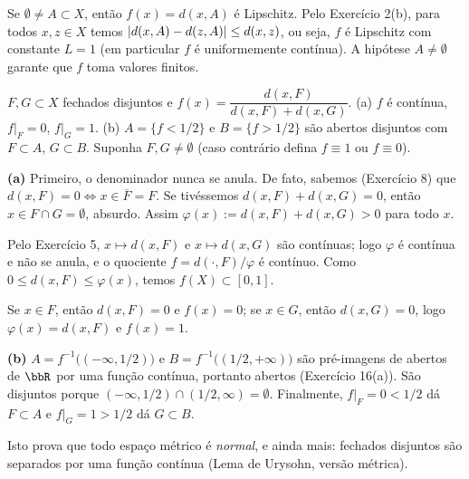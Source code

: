 \begin{exercicio}{Se $\emptyset\neq A\subset X$, então $f(x)=d(x,A)$ é Lipschitz.}
\sol
Pelo Exercício 2(b), para todos $x,z\in X$ temos $\lvert d(x,A)-d(z,A)\rvert\le d(x,z)$, ou seja, $f$ é Lipschitz com constante $L=1$ (em particular $f$ é uniformemente contínua). A hipótese $A\neq\emptyset$ garante que $f$ toma valores finitos.
\end{exercicio}

\begin{exercicio}{$F,G\subset X$ fechados disjuntos e $f(x)=\dfrac{d(x,F)}{d(x,F)+d(x,G)}$. (a) $f$ é contínua, $f|_F=0$, $f|_G=1$. (b) $A=\{f<1/2\}$ e $B=\{f>1/2\}$ são abertos disjuntos com $F\subset A$, $G\subset B$.}
\sol
Suponha $F,G\neq\emptyset$ (caso contrário defina $f\equiv 1$ ou $f\equiv 0$).

\textbf{(a)} Primeiro, o denominador nunca se anula. De fato, sabemos (Exercício 8) que $d(x,F)=0 \iff x\in\overline{F}=F$. Se tivéssemos $d(x,F)+d(x,G)=0$, então $x\in F\cap G=\emptyset$, absurdo. Assim $\varphi(x):=d(x,F)+d(x,G)>0$ para todo $x$.

Pelo Exercício 5, $x\mapsto d(x,F)$ e $x\mapsto d(x,G)$ são contínuas; logo $\varphi$ é contínua e não se anula, e o quociente $f=d(\cdot,F)/\varphi$ é contínuo. Como $0\le d(x,F)\le \varphi(x)$, temos $f(X)\subset[0,1]$.

Se $x\in F$, então $d(x,F)=0$ e $f(x)=0$; se $x\in G$, então $d(x,G)=0$, logo $\varphi(x)=d(x,F)$ e $f(x)=1$.

\textbf{(b)} $A=f^{-1}\bigl((-\infty,1/2)\bigr)$ e $B=f^{-1}\bigl((1/2,+\infty)\bigr)$ são pré-imagens de abertos de $\R$ por uma função contínua, portanto abertos (Exercício 16(a)). São disjuntos porque $(-\infty,1/2)\cap(1/2,\infty)=\emptyset$. Finalmente, $f|_F=0<1/2$ dá $F\subset A$ e $f|_G=1>1/2$ dá $G\subset B$.

\begin{obs}
Isto prova que todo espaço métrico é \emph{normal}, e ainda mais: fechados disjuntos são separados por uma função contínua (Lema de Urysohn, versão métrica).
\end{obs}
\end{exercicio}


